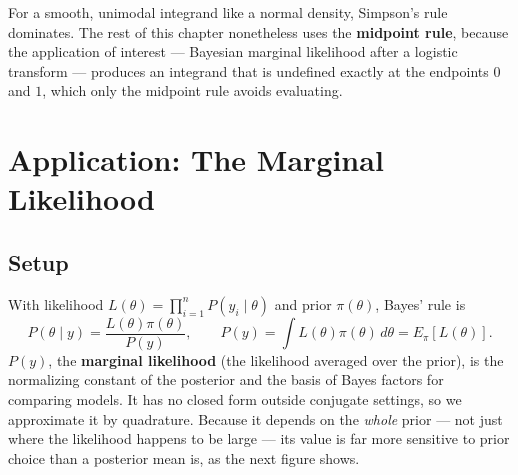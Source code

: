 \documentclass[
  letterpaper,
  DIV=11,
  numbers=noendperiod]{scrreprt}
\newcounter{none} %
\begin{document}
For a smooth, unimodal integrand like a normal density, Simpson's rule
dominates. The rest of this chapter nonetheless uses the
\textbf{midpoint rule}, because the application of interest --- Bayesian
marginal likelihood after a logistic transform --- produces an integrand
that is undefined exactly at the endpoints \(0\) and \(1\), which only
the midpoint rule avoids evaluating.

\section{Application: The Marginal
Likelihood}\label{application-the-marginal-likelihood}

\subsection{Setup}\label{setup}

With likelihood \(L(\theta) = \prod_{i=1}^n P(y_i \mid \theta)\) and
prior \(\pi(\theta)\), Bayes' rule is \[
P(\theta \mid y) = \frac{L(\theta)\pi(\theta)}{P(y)}, \qquad
P(y) = \int L(\theta)\pi(\theta)\,d\theta = E_\pi[L(\theta)].
\] \(P(y)\), the \textbf{marginal likelihood} (the likelihood averaged
over the prior), is the normalizing constant of the posterior and the
basis of Bayes factors for comparing models. It has no closed form
outside conjugate settings, so we approximate it by quadrature. Because
it depends on the \emph{whole} prior --- not just where the likelihood
happens to be large --- its value is far more sensitive to prior choice
than a posterior mean is, as the next figure shows.
\end{document}
